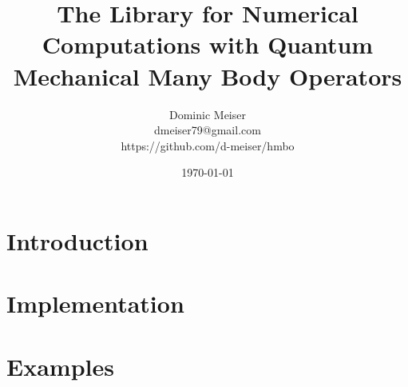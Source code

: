 \documentclass[11pt]{report}
\title{The \hmbo{} Library for Numerical Computations with Quantum
  Mechanical Many Body Operators}
\author{Dominic Meiser\\
  dmeiser79@gmail.com\\
  https://github.com/d-meiser/hmbo}
\date{\today}
\begin{document}
\maketitle

\tableofcontents

\chapter{Introduction}
\label{ch:Introduction}

\chapter{Implementation}
\label{ch:Implementation}

\chapter{Examples}
\label{ch:Examples}



\end{document}
